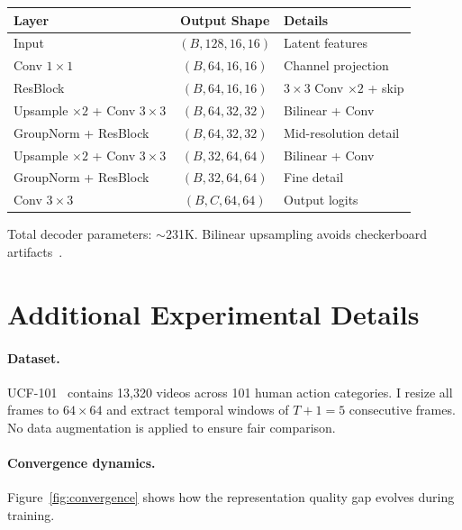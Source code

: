 \documentclass{article}
\begin{document}
\begin{center}
\begin{tabular}{lcl}
    \toprule
    \textbf{Layer} & \textbf{Output Shape} & \textbf{Details} \\
    \midrule
    Input & $(B, 128, 16, 16)$ & Latent features \\
    Conv $1\!\times\!1$ & $(B, 64, 16, 16)$ & Channel projection \\
    ResBlock & $(B, 64, 16, 16)$ & $3\!\times\!3$ Conv $\times 2$ + skip \\
    Upsample $\times 2$ + Conv $3\!\times\!3$ & $(B, 64, 32, 32)$ & Bilinear + Conv \\
    GroupNorm + ResBlock & $(B, 64, 32, 32)$ & Mid-resolution detail \\
    Upsample $\times 2$ + Conv $3\!\times\!3$ & $(B, 32, 64, 64)$ & Bilinear + Conv \\
    GroupNorm + ResBlock & $(B, 32, 64, 64)$ & Fine detail \\
    Conv $3\!\times\!3$ & $(B, C, 64, 64)$ & Output logits \\
    \bottomrule
\end{tabular}
\end{center}

Total decoder parameters: $\sim$231K. Bilinear upsampling avoids checkerboard artifacts~\cite{odena2016checkerboard}.

\section{Additional Experimental Details}
\label{app:details}

\paragraph{Dataset.} UCF-101~\cite{soomro2012ucf101} contains 13,320 videos across 101 human action categories. I resize all frames to $64 \times 64$ and extract temporal windows of $T+1 = 5$ consecutive frames. No data augmentation is applied to ensure fair comparison.

\paragraph{Convergence dynamics.} Figure~\ref{fig:convergence} shows how the representation quality gap evolves during training.
\end{document}
